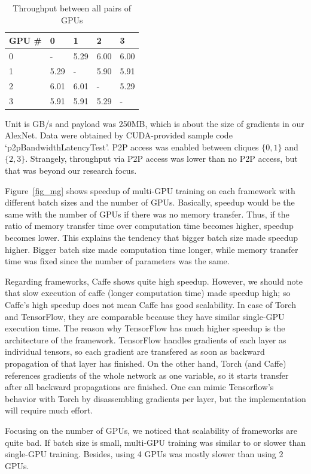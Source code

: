 \begin{table}[]
\centering
\caption{Throughput between all pairs of GPUs}
\label{table_throughput}
\begin{tabular}{l|llll}
GPU \# & 0    & 1    & 2    & 3    \\ \hline
0      & -    & 5.29 & 6.00 & 6.00 \\
1      & 5.29 & -    & 5.90 & 5.91 \\
2      & 6.01 & 6.01 & -    & 5.29 \\
3      & 5.91 & 5.91 & 5.29 & -   
\end{tabular}

Unit is GB/s and payload was 250MB, which is about the size of gradients in our AlexNet.
Data were obtained by CUDA-provided sample code `p2pBandwidthLatencyTest'.
P2P access was enabled between cliques $\{0, 1\}$ and $\{2, 3\}$.
Strangely, throughput via P2P access was lower than no P2P access, but that was beyond our research focus.
\end{table}

Figure~\ref{fig_mg} shows speedup of multi-GPU training on each framework with different batch sizes and the number of GPUs.
Basically, speedup would be the same with the number of GPUs if there was no memory transfer.
Thus, if the ratio of memory transfer time over computation time becomes higher, speedup becomes lower.
This explains the tendency that bigger batch size made speedup higher.
Bigger batch size made computation time longer, while memory transfer time was fixed since the number of parameters was the same.

Regarding frameworks, Caffe shows quite high speedup.
However, we should note that slow execution of caffe (longer computation time) made speedup high; so Caffe's high speedup does not mean Caffe has good scalability.
In case of Torch and TensorFlow, they are comparable because they have similar single-GPU execution time.
The reason why TensorFlow has much higher speedup is the architecture of the framework.
TensorFlow handles gradients of each layer as individual tensors, so each gradient are transfered as soon as backward propagation of that layer has finished.
On the other hand, Torch (and Caffe) references gradients of the whole network as one variable, so it starts transfer after all backward propagations are finished.
One can mimic Tensorflow's behavior with Torch by disassembling gradients per layer, but the implementation will require much effort.

Focusing on the number of GPUs, we noticed that scalability of frameworks are quite bad.
If batch size is small, multi-GPU training was similar to or slower than single-GPU training.
Besides, using 4 GPUs was mostly slower than using 2 GPUs.


